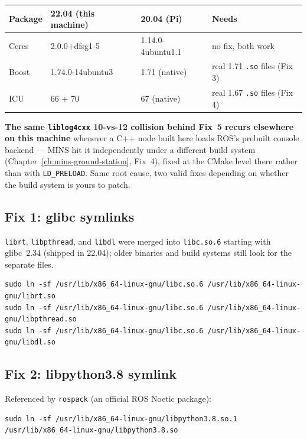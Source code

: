 \documentclass[11pt]{report}
\begin{document}
\begin{center}
\begin{tabular}{@{}llll@{}}
\toprule
\textbf{Package} & \textbf{22.04 (this machine)} & \textbf{20.04 (Pi)} & \textbf{Needs} \\
\midrule
Ceres        & 2.0.0+dfsg1-5     & 1.14.0-4ubuntu1.1 & no fix, both work \\
Boost        & 1.74.0-14ubuntu3  & 1.71 (native)     & real 1.71 \texttt{.so} files (Fix 3) \\
ICU          & 66 + 70           & 67 (native)       & real 1.67 \texttt{.so} files (Fix 4) \\
\bottomrule
\end{tabular}
\end{center}

\textbf{The same \texttt{liblog4cxx} 10-vs-12 collision behind Fix~5 recurs
elsewhere on this machine} whenever a C++ node built here loads ROS's
prebuilt console backend --- MINS hit it independently under a different
build system (Chapter~\ref{ch:mins-ground-station}, Fix~4), fixed at the CMake level
there rather than with \texttt{LD\_PRELOAD}. Same root cause, two valid
fixes depending on whether the build system is yours to patch.

\subsection{Fix 1: glibc symlinks}

\texttt{librt}, \texttt{libpthread}, and \texttt{libdl} were merged into
\texttt{libc.so.6} starting with glibc~2.34 (shipped in 22.04); older
binaries and build systems still look for the separate files.

\begin{lstlisting}[style=shell]
sudo ln -sf /usr/lib/x86_64-linux-gnu/libc.so.6 /usr/lib/x86_64-linux-gnu/librt.so
sudo ln -sf /usr/lib/x86_64-linux-gnu/libc.so.6 /usr/lib/x86_64-linux-gnu/libpthread.so
sudo ln -sf /usr/lib/x86_64-linux-gnu/libc.so.6 /usr/lib/x86_64-linux-gnu/libdl.so
\end{lstlisting}

\subsection{Fix 2: libpython3.8 symlink}

Referenced by \texttt{rospack} (an official ROS Noetic package):

\begin{lstlisting}[style=shell]
sudo ln -sf /usr/lib/x86_64-linux-gnu/libpython3.8.so.1 /usr/lib/x86_64-linux-gnu/libpython3.8.so
\end{lstlisting}
\end{document}

